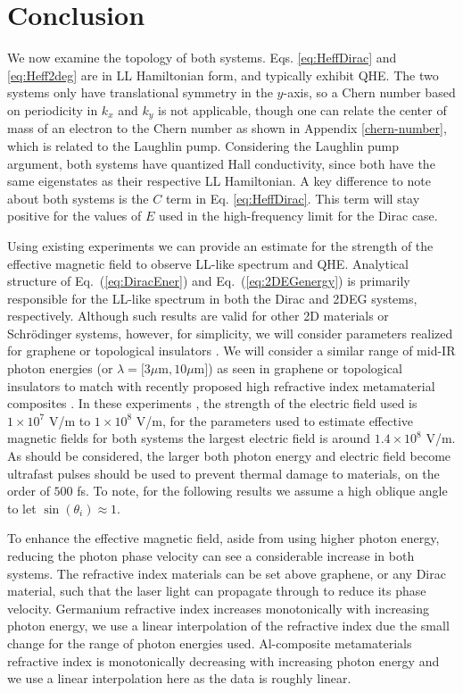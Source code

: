 \section{Conclusion}

We now examine the topology of both systems.
Eqs. \eqref{eq:HeffDirac} and \eqref{eq:Heff2deg} are in LL Hamiltonian form, and typically exhibit QHE.
The two systems only have translational symmetry in the $y$-axis, so a Chern number based on periodicity in $k_x$ and $k_y$ is not applicable, though one can relate the center of mass of an electron to the Chern number as shown in Appendix \ref{chern-number}, which is related to the Laughlin pump.
Considering the Laughlin pump argument, both systems have quantized Hall conductivity, since both have the same eigenstates as their respective LL Hamiltonian.
A key difference to note about both systems is the $C$ term in Eq. \eqref{eq:HeffDirac}.
This term will stay positive for the values of $E$ used in the high-frequency limit for the Dirac case.

Using existing experiments \cite{YHW, JWM} we can provide an estimate for the strength of the effective magnetic field to observe LL-like spectrum and QHE.
Analytical structure of Eq.~(\ref{eq:DiracEner}) and Eq.~(\ref{eq:2DEGenergy}) is primarily responsible for the LL-like spectrum in both the Dirac and 2DEG systems, respectively.
Although such results are valid for other 2D materials or Schr\"{o}dinger systems, however, for simplicity, we will consider parameters realized for graphene or topological insulators \cite{YHW, JWM}.
We will consider a similar range of mid-IR photon energies (or $\lambda = [3\mu $m$ , 10\mu $m$]$) as seen in graphene or topological insulators \cite{YHW, JWM} to match with recently proposed high refractive index metamaterial composites \cite{shimFundamentalLimitsRefractive2021}.
In these experiments \cite{YHW, JWM}, the strength of the electric field used is $1 \times 10^7$ V/m to $1 \times 10^8$ V/m, for the parameters used to estimate effective magnetic fields for both systems the largest electric field is around $1.4 \times 10^8$ V/m.
As should be considered, the larger both photon energy and electric field become ultrafast pulses should be used to prevent thermal damage to materials, on the order of $500$ fs.
To note, for the following results we assume a high oblique angle to let $\sin{(\theta_i)} \approx 1$.

To enhance the effective magnetic field, aside from using higher photon energy, reducing the photon phase velocity can see a considerable increase in both systems.
The refractive index materials can be set above graphene, or any Dirac material, such that the laser light can propagate through to reduce its phase velocity.
Germanium refractive index increases monotonically with increasing photon energy, we use a linear interpolation of the refractive index due the small change for the range of photon energies used.
Al-composite metamaterials refractive index is monotonically decreasing with increasing photon energy and we use a linear interpolation here as the data is roughly linear.

